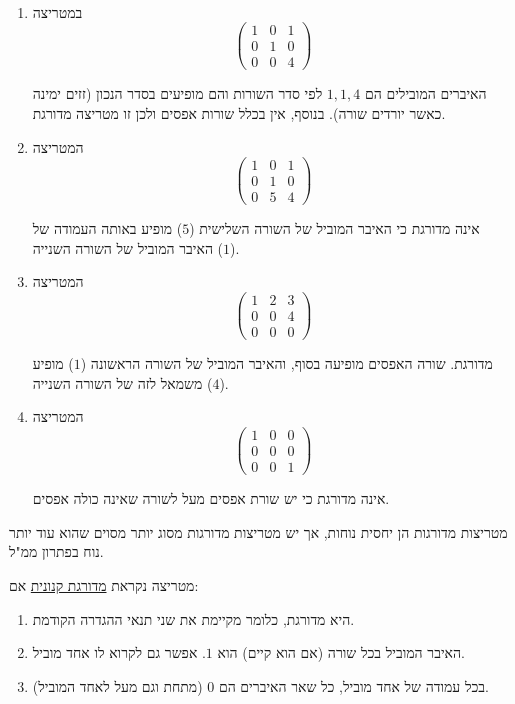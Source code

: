 \documentclass[
  hebrew,
  12pt,
  a4paper,
  oneside]{book}
\theoremstyle{definition}
\theoremstyle{remark}
\theoremstyle{plain}
\theoremstyle{remark}
\begin{document}
\begin{example}

~

\begin{enumerate}
\def\labelenumi{\arabic{enumi}.}
\item
  במטריצה \[\begin{pmatrix}1 & 0 & 1\\
  0 & 1 & 0\\
  0 & 0 & 4
  \end{pmatrix}\]

  האיברים המובילים הם \(1,1,4\) לפי סדר השורות והם מופיעים בסדר הנכון
  (זזים ימינה כאשר יורדים שורה). בנוסף, אין בכלל שורות אפסים ולכן זו
  מטריצה מדורגת.
\item
  המטריצה \[\begin{pmatrix}1 & 0 & 1\\
  0 & 1 & 0\\
  0 & 5 & 4
  \end{pmatrix}\]

  אינה מדורגת כי האיבר המוביל של השורה השלישית (\(5\)) מופיע באותה
  העמודה של האיבר המוביל של השורה השנייה (\(1\)).
\item
  המטריצה \[\begin{pmatrix}1 & 2 & 3\\
  0 & 0 & 4\\
  0 & 0 & 0
  \end{pmatrix}\]

  מדורגת. שורה האפסים מופיעה בסוף, והאיבר המוביל של השורה הראשונה
  (\(1\)) מופיע משמאל לזה של השורה השנייה (\(4\)).
\item
  המטריצה \[\begin{pmatrix}1 & 0 & 0\\
  0 & 0 & 0\\
  0 & 0 & 1
  \end{pmatrix}\]

  אינה מדורגת כי יש שורת אפסים מעל לשורה שאינה כולה אפסים.
\end{enumerate}

\end{example}

מטריצות מדורגות הן יחסית נוחות, אך יש מטריצות מדורגות מסוג יותר מסוים
שהוא עוד יותר נוח בפתרון ממ"ל.

\begin{definition}

מטריצה נקראת \ul{מדורגת קנונית} אם:

\begin{enumerate}
\def\labelenumi{\arabic{enumi}.}
\item
  היא מדורגת, כלומר מקיימת את שני תנאי ההגדרה הקודמת.
\item
  האיבר המוביל בכל שורה (אם הוא קיים) הוא \(1\). אפשר גם לקרוא לו אחד
  מוביל.
\item
  בכל עמודה של אחד מוביל, כל שאר האיברים הם \(0\) (מתחת וגם מעל לאחד
  המוביל).
\end{enumerate}

\end{definition}
\end{document}
